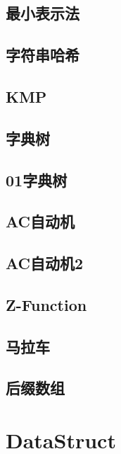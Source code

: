 \documentclass[10pt,a4paper]{article}
\begin{document}
\subsection{最小表示法}

\subsection{字符串哈希}

\subsection{KMP}

\subsection{字典树}

\subsection{01字典树}

\subsection{AC自动机}

\subsection{AC自动机2}

\subsection{Z-Function}
\begin{spacing}{1.5}

\end{spacing}

\subsection{马拉车}

\subsection{后缀数组}
\begin{spacing}{1.5}

\end{spacing}

\section{DataStruct}
\end{document}
